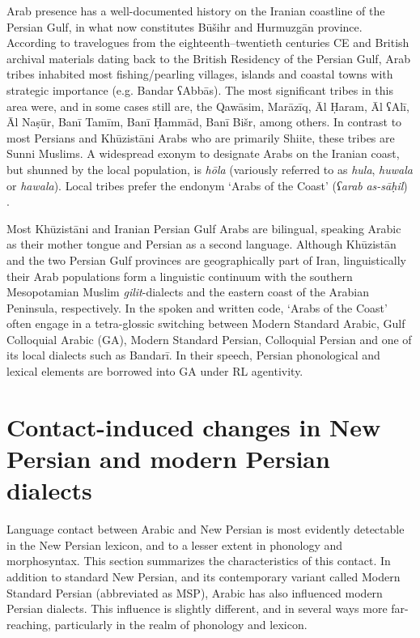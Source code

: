 \documentclass[output=paper]{langsci/langscibook}
\begin{document}
Arab presence has a well-documented history on the Iranian coastline of the Persian Gulf, in what now constitutes Būšihr and Hurmuzgān province. According to travelogues from the eighteenth–twentieth centuries CE and British archival materials dating back to the British Residency of the Persian Gulf, Arab tribes inhabited most fishing/pearling villages, islands and coastal towns with strategic importance (e.g. Bandar ʕAbbās). The most significant tribes in this area were, and in some cases still are, the Qawāsim, Marāzīq, Āl Ḥaram, Āl ʕAlī, Āl Naṣūr, Banī Tamīm, Banī Ḥammād, Banī Bišr, among others. In contrast to most Persians and Khūzistāni Arabs who are primarily Shiite, these tribes are Sunni Muslims. A widespread exonym to designate Arabs on the Iranian coast, but shunned by the local population, is \textit{hōla} (variously referred to as \textit{hula}, \textit{huwala} or \textit{hawala}). Local tribes prefer the endonym ‘Arabs of the Coast’ (\textit{ʕarab} \textit{as-sāḥil}) \citep[110]{Gaszi2017}.

Most Khūzistāni and Iranian Persian Gulf Arabs are bilingual, speaking Arabic as their mother tongue and Persian as a second language. Although Khūzistān and the two Persian Gulf provinces are geographically part of Iran, linguistically their Arab populations form a linguistic continuum with the southern Mesopotamian Muslim \textit{gilit}{}-dialects and the eastern coast of the Arabian Peninsula, respectively. In the spoken and written code, ‘Arabs of the Coast’ often engage in a tetra-glossic switching between Modern Standard Arabic, Gulf Colloquial Arabic (GA), Modern Standard Persian, Colloquial Persian and one of its local dialects such as Bandarī. In their speech, Persian phonological and lexical elements are borrowed into GA under RL agentivity.

\section{Contact-induced changes in New Persian and modern Persian dialects} \label{dial}
Language contact between Arabic and New Persian is most evidently detectable in the New Persian lexicon, and to a lesser extent in phonology and morphosyntax. This section summarizes the characteristics of this contact. In addition to standard New Persian, and its contemporary variant called Modern Standard Persian (abbreviated as MSP), Arabic has also influenced modern Persian dialects. This influence is slightly different, and in several ways more far-reaching, particularly in the realm of phonology and lexicon.
\end{document}
